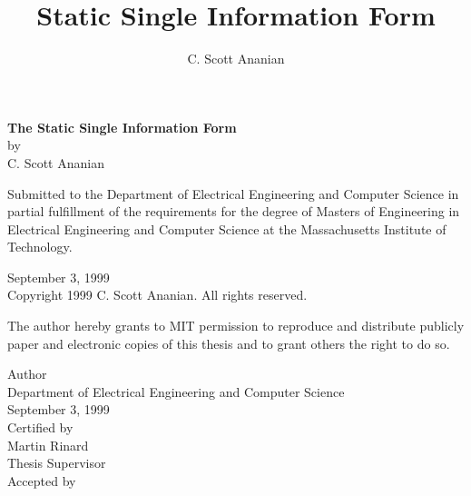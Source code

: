 \documentclass[12pt,titlepage,twoside]{article}
\title{Static Single Information Form}
\author{C. Scott Ananian}
\date{\today \\ \ignore{$ $Revision: 1.117 $ $}}
\begin{document}


\newcommand{\nl}{\\[0.5\baselineskip]}
\newcommand{\tight}{\\[-0.2\baselineskip]}
\begin{titlepage}
\vspace*{0.5cm}
\begin{center}\large
\textbf{\LARGE The Static Single Information Form}\\
by\\
C. Scott Ananian\\
\end{center}
Submitted to the Department of Electrical Engineering and Computer Science
in partial fulfillment of the requirements for the degree of
Masters of Engineering in Electrical Engineering and Computer Science
at the Massachusetts Institute of Technology.
\begin{center}
September 3, 1999\nl
Copyright 1999 C. Scott Ananian.  All rights reserved.\nl
\end{center}

\begin{flushleft}
The author hereby grants to MIT permission to reproduce and distribute
publicly paper and electronic copies of this thesis and to grant
others the right to do so.
\end{flushleft}

\vspace{0.5cm}
\begin{flushright}
Author\hrulefill\tight
\hfill Department of Electrical Engineering and Computer Science\tight
\hfill September 3, 1999\nl
Certified by\hrulefill\tight
\hfill Martin Rinard\tight
\hfill Thesis Supervisor\nl
Accepted by\hrulefill\\
\end{flushright}
\end{titlepage}\setcounter{page}{2}
\end{document}
